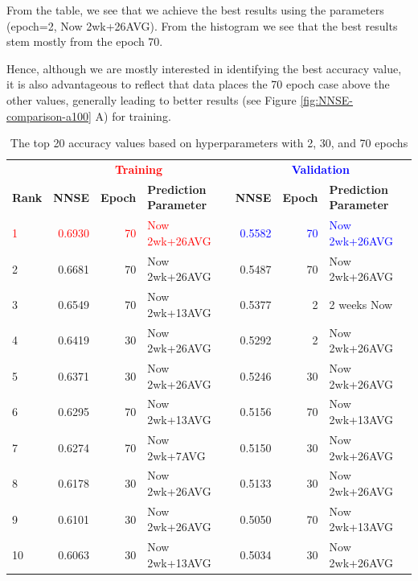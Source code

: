 \documentclass[utf8]{FrontiersinVancouver} %
\newcommand{\TODO}[2]{\todo[inline]{{\bf \color{red} #1} #2}}
\begin{document}
From the table, we see that we achieve the best
results using the parameters (epoch=2, Now 2wk+26AVG). From the histogram we see that the best results stem mostly from the epoch 70.

Hence, although we are mostly interested in identifying the best accuracy value, it is also advantageous to reflect that data places the 70 epoch case above the other values, generally leading to better results (see Figure \ref{fig:NNSE-comparison-a100} A) for training.

\TODO{GVL}{make more observations}

\begin{table}[htb]
  \caption{The top 20 accuracy values based on hyperparameters with 2, 30, and 70 epochs}
  \label{tab:ranking-accuracy}
  \renewcommand{\arraystretch}{1.2}
  \begin{center}
    {\footnotesize  
\begin{tabular}{|l||r|r|l|r|r|l|}
  \hline
 &   \multicolumn{3}{c|}{\bf \textcolor{red}{Training}}  & \multicolumn{3}{c|}{\bf \textcolor{blue}{Validation}}  \\
{\bf Rank} &  {\bf NNSE} &  {\bf Epoch} & {\bf Prediction Parameter} & {\bf NNSE} &  {\bf Epoch} & {\bf Prediction Parameter}\\
\hline
\hline
\textcolor{red}{1}  &  \textcolor{red}{0.6930} &     \textcolor{red}{70} &  \textcolor{red}{Now 2wk+26AVG} &  \textcolor{blue}{0.5582} &     \textcolor{blue}{70} &  \textcolor{blue}{Now 2wk+26AVG} \\
2  &  0.6681 &     70 &  Now 2wk+26AVG &  0.5487 &     70 &  Now 2wk+26AVG \\
3  &  0.6549 &     70 &  Now 2wk+13AVG &  0.5377 &      2 &    2 weeks Now \\
4  &  0.6419 &     30 &  Now 2wk+26AVG &  0.5292 &      2 &  Now 2wk+26AVG \\
5  &  0.6371 &     30 &  Now 2wk+26AVG &  0.5246 &     30 &  Now 2wk+26AVG \\
6  &  0.6295 &     70 &  Now 2wk+13AVG &  0.5156 &     70 &  Now 2wk+13AVG \\
7  &  0.6274 &     70 &   Now 2wk+7AVG &  0.5150 &     30 &  Now 2wk+26AVG \\
8  &  0.6178 &     30 &  Now 2wk+26AVG &  0.5133 &     30 &  Now 2wk+26AVG \\
9  &  0.6101 &     30 &  Now 2wk+26AVG &  0.5050 &     70 &  Now 2wk+13AVG \\
10 &  0.6063 &     30 &  Now 2wk+13AVG &  0.5034 &     30 &  Now 2wk+26AVG \\

\end{tabular}}
\end{center}
\end{table}
\end{document}
